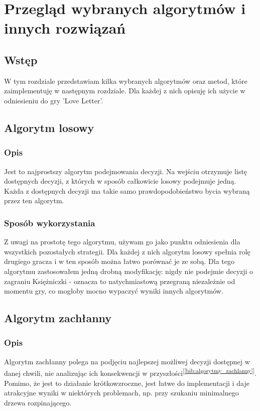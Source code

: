 \chapter{Przegląd wybranych algorytmów i innych rozwiązań}
\label{cha:rozdz3}

\section{Wstęp}
\label{sec:wstep2}
W tym rozdziale przedstawiam kilka wybranych algorytmów oraz metod, które zaimplementuję w następnym rozdziale. Dla każdej z nich opisuję ich użycie w odniesieniu do gry 'Love Letter'.

\section{Algorytm losowy}
\label{sec:algLos}
\subsection{Opis}
Jest to najprostszy algorytm podejmowania decyzji. Na wejściu otrzymuje listę dostępnych decyzji, z których w sposób całkowicie losowy podejmuje jedną. Każda z dostępnych decyzji ma takie samo prawdopodobieństwo bycia wybraną przez ten algorytm.

\subsection{Sposób wykorzystania}
Z uwagi na prostotę tego algorytmu, używam go jako punktu odniesienia dla wszystkich pozostałych strategii. Dla każdej z nich algorytm losowy spełnia rolę drugiego gracza i w ten sposób można łatwo porównać je ze sobą. Dla tego algorytmu zastosowałem jedną drobną modyfikację: nigdy nie podejmie decyzji o zagraniu Księżniczki - oznacza to natychmiastową przegraną niezależnie od momentu gry, co mogłoby mocno wypaczyć wyniki innych algorytmów.

\section{Algorytm zachłanny}
\label{sec:algZach}
\subsection{Opis}
Algorytm zachłanny polega na podjęciu najlepszej możliwej decyzji dostępnej w danej chwili, nie analizując ich konsekwencji w przyszłości\textsuperscript{[\ref{bib:algorytmy_zachlanny}]}. Pomimo, że jest to działanie krótkowzroczne, jest łatwe do implementacji i daje atrakcyjne wyniki w niektórych problemach, np. przy szukaniu minimalnego drzewa rozpinającego.

